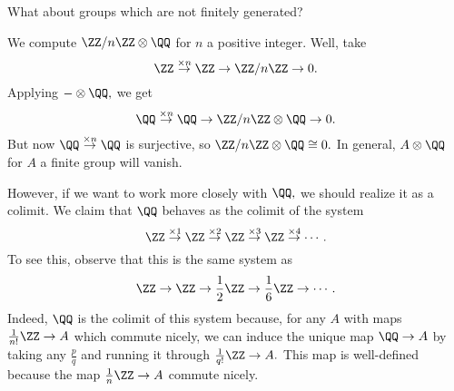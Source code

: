 What about groups which are not finitely generated?
\begin{example}
	We compute $\ZZ/n\ZZ\otimes\QQ$ for $n$ a positive integer. Well, take
	\[\ZZ\stackrel{\times n}\to\ZZ\to\ZZ/n\ZZ\to0.\]
	Applying $-\otimes\QQ,$ we get
	\[\QQ\stackrel{\times n}\to\QQ\to\ZZ/n\ZZ\otimes\QQ\to0.\]
	But now $\QQ\stackrel{\times n}\to\QQ$ is surjective, so $\ZZ/n\ZZ\otimes\QQ\cong0.$ In general, $A\otimes\QQ$ for $A$ a finite group will vanish.
\end{example}
However, if we want to work more closely with $\QQ,$ we should realize it as a colimit. We claim that $\QQ$ behaves as the colimit of the system
\[\ZZ\stackrel{\times1}\to\ZZ\stackrel{\times2}\to\ZZ\stackrel{\times3}\to\ZZ\stackrel{\times4}\to\cdots.\]
To see this, observe that this is the same system as
\[\ZZ\to\ZZ\to\frac12\ZZ\to\frac16\ZZ\to\cdots.\]
Indeed, $\QQ$ is the colimit of this system because, for any $A$ with maps $\frac1{n!}\ZZ\to A$ which commute nicely, we can induce the unique map $\QQ\to A$ by taking any $\frac pq$ and running it through $\frac1{q!}\ZZ\to A.$ This map is well-defined because the map $\frac1n\ZZ\to A$ commute nicely.

